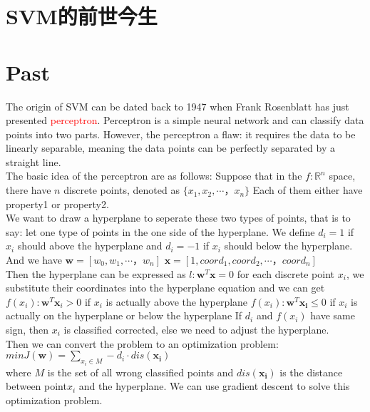 \documentclass{article}
\begin{document}
{\centering\section*{SVM的前世今生}}
\section{Past}
The origin of SVM can be dated back to 1947 when Frank Rosenblatt has just presented \textcolor{red}{perceptron}. Perceptron is a 
simple neural network and can classify data points into two parts. However, the perceptron a flaw: it requires the data to be linearly separable, 
meaning the data points can be perfectly separated by a straight line.\\
\indent The basic idea of the perceptron are as follows:
Suppose that in the $f: \mathbb{R}^n$ space, there have $n$ discrete points, denoted as $\{x_1, x_2, \cdots ， x_n\}$
Each of them either have property1 or property2. \\
\indent We want to draw a hyperplane to seperate these two types of points, that is to say: let one type of points in the one side of the hyperplane.
We define $d_i = 1$ if $x_i$ should above the hyperplane and $d_i = -1$ if $x_i$ should below the hyperplane.\\
\indent And we have $\bm{w} = [w_0, w_1, \cdots ， w_n]$
$\bm{x} = [1 , coord_1, coord_2, \cdots ， coord_n]$\\
\indent Then the hyperplane can be expressed as $ l:\bm{w}^T \bm{x} = 0$
for each discrete point $x_i$, we substitute their coordinates into the hyperplane equation and we can get\\
$f(x_i): \bm{w}^T \bm{x}_i >0 $ if $x_i$ is actually above the hyperplane
$f(x_i): \bm{w}^T \bm{x_i} \leq 0 $ if $x_i$ is actually on the hyperplane or below the hyperplane
If $d_i$ and $f(x_i)$ have same sign, then $x_i$ is classified corrected, else we need to adjust the hyperplane.\\
\indent Then we can convert the problem to an optimization problem:\\
$min J(\bm{w}) = \sum\limits_{x_i \in M} -d_i · dis(\bm{x_i})$\\
where $M$ is the set of all wrong classified points and $dis(\bm{x_i})$ is the distance between point$x_i$ and the hyperplane.
We can use gradient descent to solve this optimization problem.\\
\end{document}
